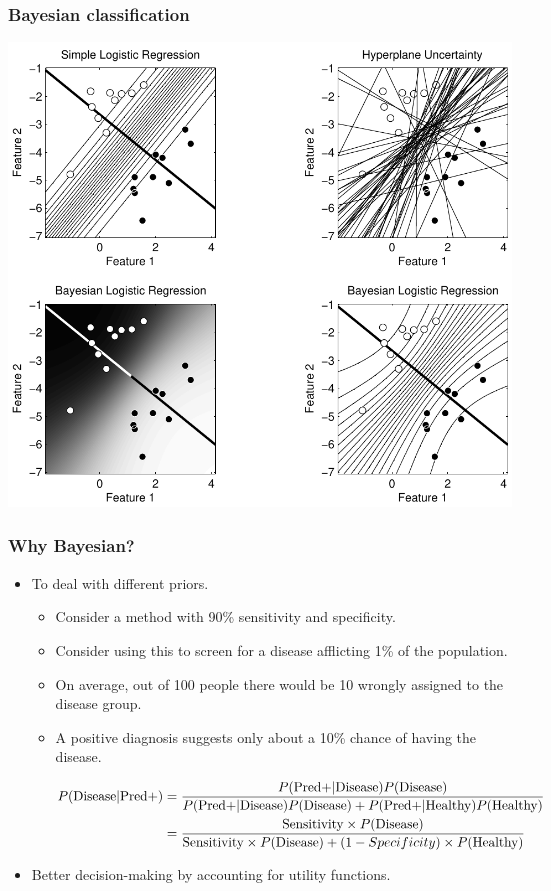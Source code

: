 \documentclass{beamer}
\begin{document}
\begin{frame}
\frametitle{Bayesian classification}
\begin{center}
\includegraphics[height=.8\textheight]{logistic_regr}
\end{center}
\end{frame}

\begin{frame}
\frametitle{Why Bayesian?}
\begin{itemize}
\item To deal with different priors.
\begin{itemize}
\item Consider a method with 90\% sensitivity and specificity.
\item Consider using this to screen for a disease afflicting 1\% of the population.
\item On average, out of 100 people there would be 10 wrongly assigned to the disease group.
\item A positive diagnosis suggests only about a 10\% chance of having the disease.
{\small
\begin{eqnarray*}
P(\text{Disease} | \text{Pred+}) & = \frac{P(\text{Pred+} | \text{Disease}) P(\text{Disease})}{P(\text{Pred+} | \text{Disease}) P(\text{Disease}) + P(\text{Pred+} | \text{Healthy}) P(\text{Healthy})}\cr
 & = \frac{\text{Sensitivity} \times P(\text{Disease})}{\text{Sensitivity} \times P(\text{Disease}) + (1-Specificity) \times P(\text{Healthy})}
\end{eqnarray*}
\par
}
\end{itemize}
\item Better decision-making by accounting for utility functions.
\end{itemize}
\end{frame}
\end{document}
